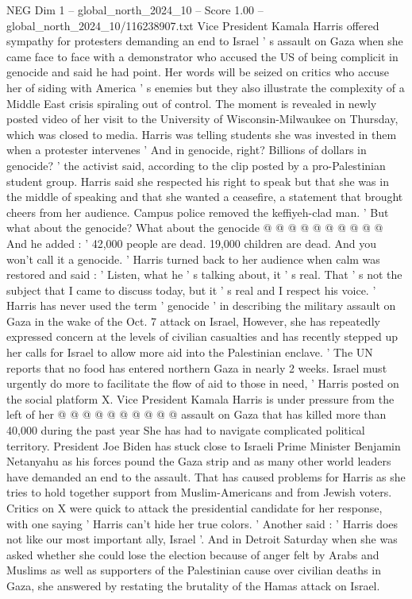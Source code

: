 \begin{textsample}{NEG Dim 1 – global\_north\_2024\_10 – Score 1.00 – global\_north\_2024\_10/116238907.txt}  \label{ex:f1_neg_369}
Vice President Kamala Harris offered sympathy for protesters demanding an end to Israel ' s assault on Gaza when she came face to face with a demonstrator who accused the US of being complicit in genocide and said he had point.
Her words will be seized on critics who accuse her of siding with America ' s enemies but they also illustrate the complexity of a Middle East crisis spiraling out of control.
The moment is revealed in newly posted video of her visit to the University of Wisconsin-Milwaukee on Thursday, which was closed to media.
Harris was telling students she was invested in them when a protester intervenes ' And in genocide, right?
Billions of dollars in genocide? ' the activist said, according to the clip posted by a pro-Palestinian student group.
Harris said she respected his right to speak but that she was in the middle of speaking and that she wanted a ceasefire, a statement that brought cheers from her audience.
Campus police removed the keffiyeh-clad man. ' But what about the genocide?
What about the genocide @ @ @ @ @ @ @ @ @ @ And he added : ' 42,000 people are dead. 19,000 children are dead.
And you won't call it a genocide. ' Harris turned back to her audience when calm was restored and said : ' Listen, what he ' s talking about, it ' s real.
That ' s not the subject that I came to discuss today, but it ' s real and I respect his voice. ' Harris has never used the term ' genocide ' in describing the military assault on Gaza in the wake of the Oct. 7 attack on Israel, However, she has repeatedly expressed concern at the levels of civilian casualties and has recently stepped up her calls for Israel to allow more aid into the Palestinian enclave. ' The UN reports that no food has entered northern Gaza in nearly 2 weeks.
Israel must urgently do more to facilitate the flow of aid to those in need, ' Harris posted on the social platform X.
Vice President Kamala Harris is under pressure from the left of her @ @ @ @ @ @ @ @ @ @ assault on Gaza that has killed more than 40,000 during the past year She has had to navigate complicated political territory.
President Joe Biden has stuck close to Israeli Prime Minister Benjamin Netanyahu as his forces pound the Gaza strip and as many other world leaders have demanded an end to the assault.
That has caused problems for Harris as she tries to hold together support from Muslim-Americans and from Jewish voters.
Critics on X were quick to attack the presidential candidate for her response, with one saying ' Harris can't hide her true colors. ' Another said : ' Harris does not like our most important ally, Israel '.
And in Detroit Saturday when she was asked whether she could lose the election because of anger felt by Arabs and Muslims as well as supporters of the Palestinian cause over civilian deaths in Gaza, she answered by restating the brutality of the Hamas attack on Israel.

\end{textsample}
